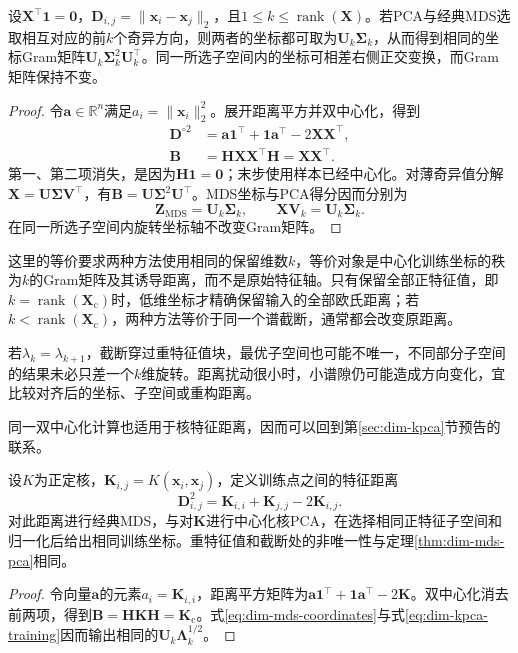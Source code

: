\begin{theorem}[欧氏距离下经典MDS与PCA的关系]
  \label{thm:dim-mds-pca}
  设$\bm{X}^{\top}\bm{1}=\bm{0}$，$\bm{D}_{i,j}=\lVert\bm{x}_i-\bm{x}_j\rVert_2$，且$1\leq k\leq\operatorname{rank}(\bm{X})$。若PCA与经典MDS选取相互对应的前$k$个奇异方向，则两者的坐标都可取为$\bm{U}_k\bm{\Sigma}_k$，从而得到相同的坐标Gram矩阵$\bm{U}_k\bm{\Sigma}_k^2\bm{U}_k^{\top}$。同一所选子空间内的坐标可相差右侧正交变换，而Gram矩阵保持不变。
\end{theorem}
\begin{proof}
  令$\bm{a}\in\mathbb{R}^n$满足$a_i=\lVert\bm{x}_i\rVert_2^2$。展开距离平方并双中心化，得到
  \[
    \begin{aligned}
      \bm{D}^{\circ2}
        &=\bm{a}\bm{1}^{\top}+\bm{1}\bm{a}^{\top}
          -2\bm{X}\bm{X}^{\top},\\
      \bm{B}
        &=\bm{H}\bm{X}\bm{X}^{\top}\bm{H}
         =\bm{X}\bm{X}^{\top}.
    \end{aligned}
  \]
  第一、第二项消失，是因为$\bm{H}\bm{1}=\bm{0}$；末步使用样本已经中心化。对薄奇异值分解$\bm{X}=\bm{U}\bm{\Sigma}\bm{V}^{\top}$，有$\bm{B}=\bm{U}\bm{\Sigma}^2\bm{U}^{\top}$。MDS坐标与PCA得分因而分别为
  \[
    \bm{Z}_{\mathrm{MDS}}=\bm{U}_k\bm{\Sigma}_k,
    \qquad
    \bm{X}\bm{V}_k=\bm{U}_k\bm{\Sigma}_k.
  \]
  在同一所选子空间内旋转坐标轴不改变Gram矩阵。
\end{proof}

这里的等价要求两种方法使用相同的保留维数$k$，等价对象是中心化训练坐标的秩为$k$的Gram矩阵及其诱导距离，而不是原始特征轴。只有保留全部正特征值，即$k=\operatorname{rank}(\bm{X}_{\mathrm{c}})$时，低维坐标才精确保留输入的全部欧氏距离；若$k<\operatorname{rank}(\bm{X}_{\mathrm{c}})$，两种方法等价于同一个谱截断，通常都会改变原距离。

若$\lambda_k=\lambda_{k+1}$，截断穿过重特征值块，最优子空间也可能不唯一，不同部分子空间的结果未必只差一个$k$维旋转。距离扰动很小时，小谱隙仍可能造成方向变化，宜比较对齐后的坐标、子空间或重构距离。

同一双中心化计算也适用于核特征距离，因而可以回到第\ref{sec:dim-kpca}节预告的联系。

\begin{theorem}[核诱导距离下的等价关系]
  \label{thm:dim-kpca-mds}
  设$K$为正定核，$\bm{K}_{i,j}=K(\bm{x}_i,\bm{x}_j)$，定义训练点之间的特征距离
  \[
    \bm{D}_{i,j}^2
    =\bm{K}_{i,i}+\bm{K}_{j,j}-2\bm{K}_{i,j}.
  \]
  对此距离进行经典MDS，与对$\bm{K}$进行中心化核PCA，在选择相同正特征子空间和归一化后给出相同训练坐标。重特征值和截断处的非唯一性与定理\ref{thm:dim-mds-pca}相同。
\end{theorem}
\begin{proof}
  令向量$\bm{a}$的元素$a_i=\bm{K}_{i,i}$，距离平方矩阵为$\bm{a}\bm{1}^{\top}+\bm{1}\bm{a}^{\top}-2\bm{K}$。双中心化消去前两项，得到$\bm{B}=\bm{H}\bm{K}\bm{H}=\bm{K}_{\mathrm{c}}$。式\eqref{eq:dim-mds-coordinates}与式\eqref{eq:dim-kpca-training}因而输出相同的$\bm{U}_k\bm{\Lambda}_k^{1/2}$。
\end{proof}


